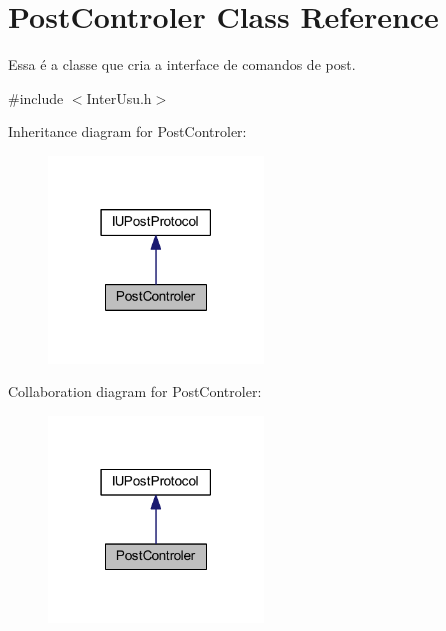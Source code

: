 \hypertarget{class_post_controler}{\section{Post\-Controler Class Reference}
\label{class_post_controler}
}


Essa é a classe que cria a interface de comandos de post.  




{\ttfamily \#include $<$Inter\-Usu.\-h$>$}



Inheritance diagram for Post\-Controler\-:\nopagebreak
\begin{figure}[H]
\begin{center}
\leavevmode
\includegraphics[width=162pt]{class_post_controler__inherit__graph}
\end{center}
\end{figure}


Collaboration diagram for Post\-Controler\-:\nopagebreak
\begin{figure}[H]
\begin{center}
\leavevmode
\includegraphics[width=162pt]{class_post_controler__coll__graph}
\end{center}
\end{figure}
